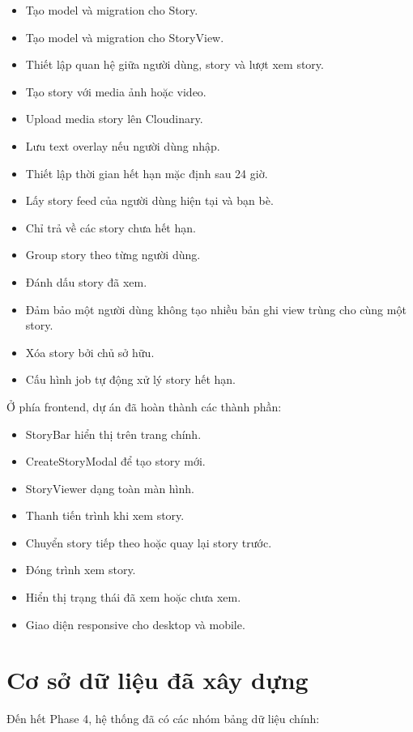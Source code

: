 \documentclass[12pt,a4paper]{article}
\begin{document}
\begin{itemize}
  \item Tạo model và migration cho Story.
  \item Tạo model và migration cho StoryView.
  \item Thiết lập quan hệ giữa người dùng, story và lượt xem story.
  \item Tạo story với media ảnh hoặc video.
  \item Upload media story lên Cloudinary.
  \item Lưu text overlay nếu người dùng nhập.
  \item Thiết lập thời gian hết hạn mặc định sau 24 giờ.
  \item Lấy story feed của người dùng hiện tại và bạn bè.
  \item Chỉ trả về các story chưa hết hạn.
  \item Group story theo từng người dùng.
  \item Đánh dấu story đã xem.
  \item Đảm bảo một người dùng không tạo nhiều bản ghi view trùng cho cùng một story.
  \item Xóa story bởi chủ sở hữu.
  \item Cấu hình job tự động xử lý story hết hạn.
\end{itemize}

Ở phía frontend, dự án đã hoàn thành các thành phần:

\begin{itemize}
  \item StoryBar hiển thị trên trang chính.
  \item CreateStoryModal để tạo story mới.
  \item StoryViewer dạng toàn màn hình.
  \item Thanh tiến trình khi xem story.
  \item Chuyển story tiếp theo hoặc quay lại story trước.
  \item Đóng trình xem story.
  \item Hiển thị trạng thái đã xem hoặc chưa xem.
  \item Giao diện responsive cho desktop và mobile.
\end{itemize}

\section{Cơ sở dữ liệu đã xây dựng}

Đến hết Phase 4, hệ thống đã có các nhóm bảng dữ liệu chính:
\end{document}
